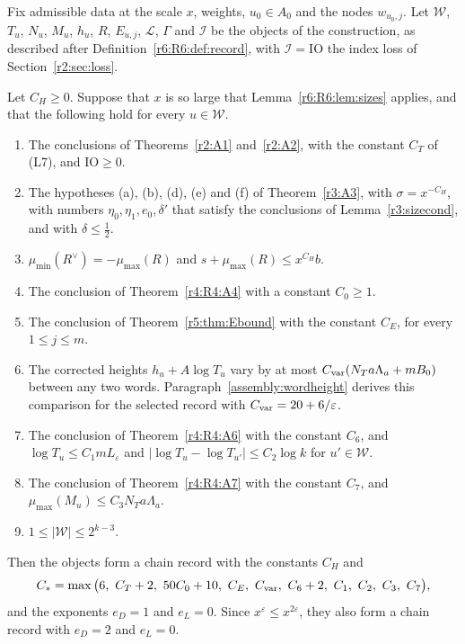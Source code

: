 Fix admissible data at the scale $x$, weights, $u_0\in A_0$ and the nodes $w_{u_0,j}$. Let $\mathcal W$, $T_u$, $N_u$, $M_u$, $h_u$, $R$, $E_{u,j}$, $\mathcal L$, $\Gamma$ and $\mathcal I$ be the objects of the construction, as described after Definition~\ref{r6:R6:def:record}, with $\mathcal I=\mathrm{IO}$ the index loss of Section~\ref{r2:sec:loss}.

\begin{proposition}\label{a8:prop:record}
Let $C_H\ge0$. Suppose that $x$ is so large that Lemma~\ref{r6:R6:lem:sizes} applies, and that the following hold for every $u\in\mathcal W$.
\begin{enumerate}
\item[(i)] The conclusions of Theorems~\ref{r2:A1} and~\ref{r2:A2}, with the constant $C_T$ of (L7), and $\mathrm{IO}\ge0$.
\item[(ii)] The hypotheses (a), (b), (d), (e) and (f) of Theorem~\ref{r3:A3}, with $\sigma=x^{-C_H}$, with numbers $\eta_0,\eta_1,e_0,\delta'$ that satisfy the conclusions of Lemma~\ref{r3:sizecond}, and with $\delta\le\frac12$.
\item[(iii)] $\mu_{\min}(R^\vee)=-\mu_{\max}(R)$ and $s+\mu_{\max}(R)\le x^{C_H}b$.
\item[(iv)] The conclusion of Theorem~\ref{r4:R4:A4} with a constant $C_0\ge1$.
\item[(v)] The conclusion of Theorem~\ref{r5:thm:Ebound} with the constant $C_E$, for every $1\le j\le m$.
\item[(vi)] The corrected heights $h_u+A\log T_u$ vary by at most $C_{\rm var}(N_Ta\Lambda_a+m B_0)$ between any two words. Paragraph~\ref{assembly:wordheight} derives this comparison for the selected record with $C_{\rm var}=20+6/\varepsilon$.
\item[(vii)] The conclusion of Theorem~\ref{r4:R4:A6} with the constant $C_6$, and $\log T_u\le C_1mL_\varepsilon$ and $\lvert\log T_u-\log T_{u'}\rvert\le C_2\log k$ for $u'\in\mathcal W$.
\item[(viii)] The conclusion of Theorem~\ref{r4:R4:A7} with the constant $C_7$, and $\mu_{\max}(M_u)\le C_3N_Ta\Lambda_a$.
\item[(ix)] $1\le\lvert\mathcal W\rvert\le2^{k-3}$.
\end{enumerate}
Then the objects form a chain record with the constants $C_H$ and
\[
C_\ast=\max\big(6,\ C_T+2,\ 50C_0+10,\ C_E,\ C_{\rm var},\ C_6+2,\ C_1,\ C_2,\ C_3,\ C_7\big),
\]
and the exponents $e_D=1$ and $e_L=0$. Since $x^{\varepsilon}\le x^{2\varepsilon}$, they also form a chain record with $e_D=2$ and $e_L=0$.
\end{proposition}

